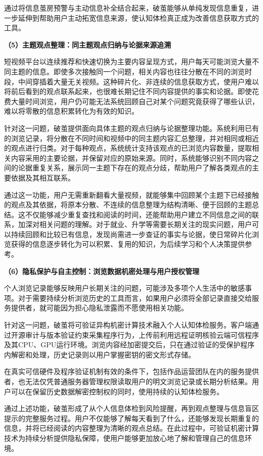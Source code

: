 通过将信息茧房预警与主动信息补全结合起来，破茧能够从单纯发现信息重复，进一步延伸到帮助用户主动拓宽信息来源，使认知体检真正成为改善信息获取方式的工具。

\textbf{（5）主题观点整理：同主题观点归纳与论据来源追溯}

短视频平台以连续推荐和快速切换为主要内容呈现方式，用户每天可能浏览大量不同主题的信息。即使多次接触同一个问题，相关内容也往往分散在不同的浏览时段，中间穿插着大量无关视频。这种碎片化、非连续的信息获取方式，使用户难以将前后看到的观点联系起来，也很难长期记住不同内容提供的事实和论据。即使花费大量时间浏览，用户仍可能无法系统回顾自己对某个问题究竟获得了哪些认识，难以将零散的信息积累转化为有效的知识。

针对这一问题，破茧提供面向具体主题的观点归纳与论据整理功能。系统利用已有的浏览记录，将分散在不同时间和视频中的同主题内容汇总整理，并对相同或相近的观点进行归类。对于每种观点，系统统计支持该观点的已浏览内容数量，提取相关内容采用的主要论据，并保留对应的原始来源。同时，系统能够识别不同内容之间的论据重复关系，展示同一主题下存在的观点分歧，帮助用户了解各类观点的主要依据及其相互联系。

通过这一功能，用户无需重新翻看大量视频，就能够集中回顾某个主题下已经接触的观点及其依据，将原本分散、不连续的信息整理为结构清晰、便于回顾的主题总结。这不仅能够减少重复查找和阅读的时间，还能帮助用户建立不同信息之间的联系，加深对相关问题的理解。对于就业、升学等需要长期关注的现实问题，用户可以持续回顾和比较已有信息，发现尚需进一步查证的事实与论据，使日常碎片化浏览获得的信息逐步转化为可以积累、复用的知识，为后续学习和个人决策提供参考。

\textbf{（6）隐私保护与自主控制：浏览数据机密处理与用户授权管理}

个人浏览记录能够反映用户长期关注的问题，可能涉及多项个人生活中的敏感事项。对于需要持续分析浏览历史的工具而言，如果用户必须将全部记录直接交给服务提供者，就可能因为担心隐私泄露而不愿使用相关功能。

针对这一问题，破茧将可验证异构机密计算技术融入个人认知体检服务。客户端通过开源审计与版本验证约束采集程序行为，上传前利用远程证明核验云端可信程序及其CPU、GPU运行环境。浏览内容经加密提交后，只在通过验证的受保护程序内解密和处理，历史记录则以用户掌握密钥的密文形式存储。

在真实可信硬件及程序验证机制有效的条件下，包括作品运营团队在内的服务提供者，也无法仅凭普通服务器管理权限读取用户的明文浏览记录或长期分析结果。用户可以在保留历史数据解密控制权的同时，使用持续的认知体检服务。

通过上述功能，破茧形成了从个人信息体检到风险提醒，再到观点整理与信息盲区提示的完整服务过程。用户不仅能够了解每天看到了什么，还能够发现长期重复的信息，并将已经阅读的内容整理为清晰的观点总结。在此过程中，可验证机密计算技术为持续分析提供隐私保障，使用户能够更加放心地了解和管理自己的信息环境。

